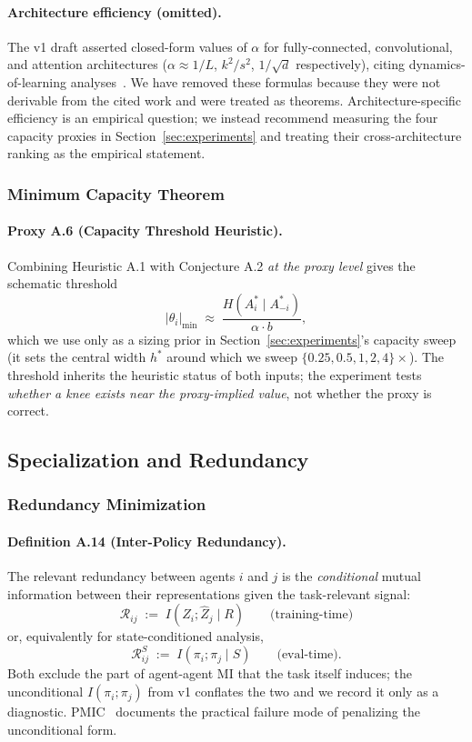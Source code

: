 \documentclass[10pt, letterpaper]{article}
\begin{document}
\paragraph{Architecture efficiency (omitted).} The v1 draft asserted closed-form values of $\alpha$ for fully-connected, convolutional, and attention architectures ($\alpha \approx 1/L$, $k^2/s^2$, $1/\sqrt{d}$ respectively), citing dynamics-of-learning analyses~\cite{saxe2019}. We have removed these formulas because they were not derivable from the cited work and were treated as theorems. Architecture-specific efficiency is an empirical question; we instead recommend measuring the four capacity proxies in Section~\ref{sec:experiments} and treating their cross-architecture ranking as the empirical statement.

\subsubsection{Minimum Capacity Theorem}

\paragraph{Proxy A.6 (Capacity Threshold Heuristic).} Combining Heuristic A.1 with Conjecture A.2 \emph{at the proxy level} gives the schematic threshold
\[|\theta_i|_\text{min} \;\approx\; \frac{H(A_i^*\mid A_{-i}^*)}{\alpha \cdot b},\]
which we use only as a sizing prior in Section~\ref{sec:experiments}'s capacity sweep (it sets the central width $h^*$ around which we sweep $\{0.25,0.5,1,2,4\}\times$). The threshold inherits the heuristic status of both inputs; the experiment tests \emph{whether a knee exists near the proxy-implied value}, not whether the proxy is correct.

\subsection{Specialization and Redundancy}

\subsubsection{Redundancy Minimization}

\paragraph{Definition A.14 (Inter-Policy Redundancy).} The relevant redundancy between agents $i$ and $j$ is the \emph{conditional} mutual information between their representations given the task-relevant signal:
\[\mathcal{R}_{ij} \;:=\; I(\hat{Z}_i; \hat{Z}_j \mid R) \qquad\text{(training-time)}\]
or, equivalently for state-conditioned analysis,
\[\mathcal{R}^{S}_{ij} \;:=\; I(\pi_i; \pi_j \mid S) \qquad\text{(eval-time)}.\]
Both exclude the part of agent-agent MI that the task itself induces; the unconditional $I(\pi_i; \pi_j)$ from v1 conflates the two and we record it only as a diagnostic. PMIC~\cite{li2022pmic} documents the practical failure mode of penalizing the unconditional form.
\end{document}
